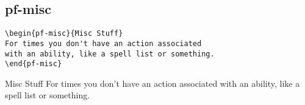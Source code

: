 \begin{multicols}{2}
\subsection{pf-misc}
\begin{verbatim}
\begin{pf-misc}{Misc Stuff}
For times you don't have an action associated
with an ability, like a spell list or something.
\end{pf-misc}
\end{verbatim}
\begin{pf-misc}{Misc Stuff}
For times you don't have an action associated with an ability, like a spell list or something.
\end{pf-misc}

\end{multicols}

